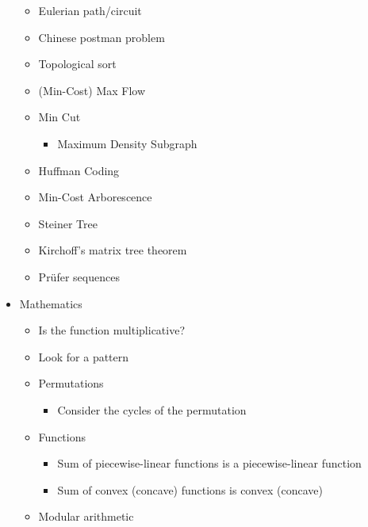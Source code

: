 \documentclass[9pt,a4paper,twocolumn,landscape,oneside]{amsart}
\begin{document}
\begin{itemize}
\begin{itemize}
                        \item Eulerian path/circuit
                        \item Chinese postman problem
                        \item Topological sort
                        \item (Min-Cost) Max Flow
                        \item Min Cut
                            \begin{itemize}
                                \item Maximum Density Subgraph
                            \end{itemize}
                        \item Huffman Coding
                        \item Min-Cost Arborescence
                        \item Steiner Tree
                        \item Kirchoff's matrix tree theorem
                        \item Pr\"ufer sequences
                    \end{itemize}
                \item Mathematics
                    \begin{itemize}
                        \item Is the function multiplicative?
                        \item Look for a pattern
                        \item Permutations
                            \begin{itemize}
                                \item Consider the cycles of the permutation
                            \end{itemize}
                        \item Functions
                            \begin{itemize}
                                \item Sum of piecewise-linear functions is a piecewise-linear function
                                \item Sum of convex (concave) functions is convex (concave)
                            \end{itemize}
                        \item Modular arithmetic
                            \begin{itemize}

\end{itemize}
\end{itemize}
\end{itemize}
\end{document}
